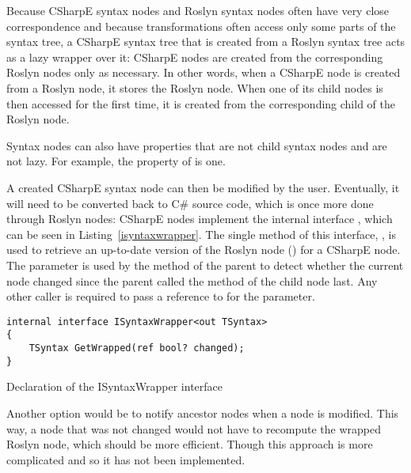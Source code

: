 \medskip

Because CSharpE syntax nodes and Roslyn syntax nodes often have very close correspondence and because transformations often access only some parts of the syntax tree, a CSharpE syntax tree that is created from a Roslyn syntax tree acts as a lazy wrapper over it: CSharpE nodes are created from the corresponding Roslyn nodes only as necessary. In other words, when a CSharpE node is created from a Roslyn node, it stores the Roslyn node. When one of its child nodes is then accessed for the first time, it is created from the corresponding child of the Roslyn node.

Syntax nodes can also have properties that are not child syntax nodes and are not lazy. For example, the property  of  is one.

\medskip

A created CSharpE syntax node can then be modified by the user. Eventually, it will need to be converted back to C\# source code, which is once more done through Roslyn nodes: CSharpE nodes implement the internal interface , which can be seen in Listing~\ref{isyntaxwrapper}. The single method of this interface, , is used to retrieve an up-to-date version of the Roslyn node () for a CSharpE node. The  parameter is used by the  method of the parent to detect whether the current node changed since the parent called the  method of the child node last. Any other caller is required to pass a reference to  for the parameter.

\begin{listing}
\begin{verbatim}
internal interface ISyntaxWrapper<out TSyntax>
{
    TSyntax GetWrapped(ref bool? changed);
}
\end{verbatim}
\caption{Declaration of the ISyntaxWrapper interface}
\label{isyntaxwrapper}
\end{listing}

Another option would be to notify ancestor nodes when a node is modified. This way, a node that was not changed would not have to recompute the wrapped Roslyn node, which should be more efficient. Though this approach is more complicated and so it has not been implemented.

\medskip


